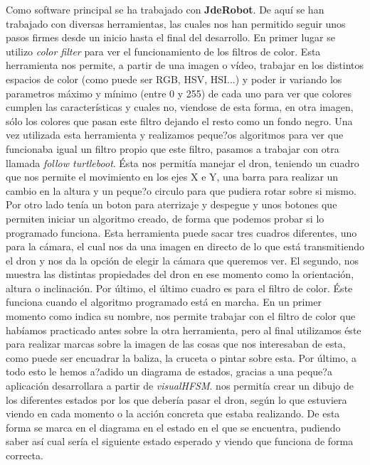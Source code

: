 \documentclass{report}
\begin{document}
\hspace{1 cm} Como software principal se ha trabajado con \textbf{JdeRobot}. De aqu\'i se han trabajado con diversas herramientas, las cuales nos han permitido seguir unos pasos firmes desde un inicio hasta el final del desarrollo. 
En primer lugar se utilizo \textit{color filter} para ver el funcionamiento de los filtros de color. Esta herramienta nos permite, a partir de una imagen o v\'ideo, trabajar en los distintos espacios de color (como puede ser RGB, HSV, HSI...) y poder ir variando los parametros m\'aximo y m\'inimo (entre 0 y 255) de cada uno para ver que colores cumplen las caracter\'isticas y cuales no, viendose de esta forma, en otra imagen, s\'olo los colores que pasan este filtro dejando el resto como un fondo negro. 
Una vez utilizada esta herramienta y realizamos peque?os algoritmos para ver que funcionaba igual un filtro propio que este filtro, pasamos a trabajar con otra llamada \textit{follow turtleboot}. \'Esta  nos permit\'ia manejar el dron, teniendo un cuadro que nos permite el movimiento en los ejes X e Y, una barra para realizar un cambio en la altura y un peque?o circulo para que pudiera rotar sobre si mismo. Por otro lado ten\'ia un boton para aterrizaje y despegue y unos botones que permiten iniciar un algoritmo creado, de forma que podemos probar si lo programado funciona. Esta herramienta puede sacar tres cuadros diferentes, uno para la c\'amara, el cual nos da una imagen en directo de lo que est\'a transmitiendo el dron y nos da la opci\'on de elegir la c\'amara que queremos ver. El segundo, nos muestra las distintas propiedades del dron en ese momento como la orientaci\'on, altura o inclinaci\'on. Por \'ultimo, el \'ultimo cuadro es para el filtro de color. \'Este funciona cuando el algoritmo programado est\'a en marcha. En un primer momento como indica su nombre, nos permite trabajar con el filtro de color que hab\'iamos practicado antes sobre la otra herramienta, pero al final utilizamos \'este para realizar marcas sobre la imagen de las cosas que nos interesaban de esta, como puede ser encuadrar la baliza, la cruceta o pintar sobre esta. 
Por \'ultimo, a todo esto le hemos a?adido un diagrama de estados, gracias a una peque?a aplicaci\'on desarrollara a partir de \textit{visualHFSM}. nos permit\'ia crear un dibujo de los diferentes estados por los que deber\'ia pasar el dron, seg\'un lo que estuviera viendo en cada momento o la acci\'on concreta que estaba realizando. De esta forma se marca en el diagrama en el estado en el que se encuentra, pudiendo saber as\'i cual ser\'ia el siguiente estado esperado y viendo que funciona de forma correcta.
\end{document}
